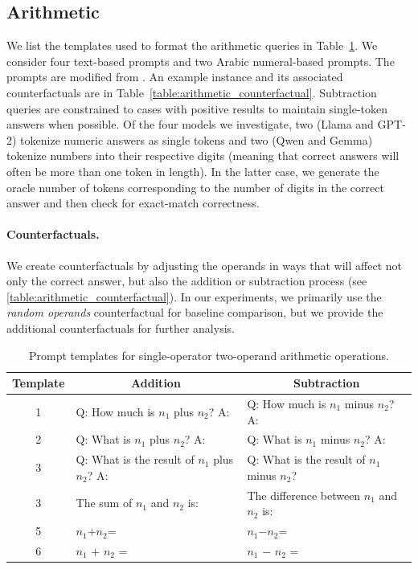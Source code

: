 \documentclass{article}
\theoremstyle{plain}
\theoremstyle{definition}
\theoremstyle{remark}
\begin{document}
\newpage
\subsection{Arithmetic}\label{app:arithmetic_data}
We list the templates used to format the arithmetic queries in Table~\ref{table:arithmetic_query_template}. We consider four text-based prompts and two Arabic numeral-based prompts. The prompts are modified from \citet{stolfo2023mechanistic}. An example instance and its associated counterfactuals are in  Table~\ref{table:arithmetic_counterfactual}. Subtraction queries are constrained to cases with positive results to maintain single-token answers when possible. 
Of the four models we investigate, two (Llama and GPT-2) tokenize numeric answers as single tokens and two (Qwen and Gemma) tokenize numbers into their respective digits (meaning that correct answers will often be more than one token in length). In the latter case, we generate the oracle number of tokens corresponding to the number of digits in the correct answer and then check for exact-match correctness.


\paragraph{Counterfactuals.} We create counterfactuals by adjusting the operands in ways that will affect not only the correct answer, but also the addition or subtraction process (see \autoref{table:arithmetic_counterfactual}). In our experiments, we primarily use the \textit{random operands} counterfactual for baseline comparison, but we provide the additional counterfactuals for further analysis. 


\begin{table}[h]
    \centering
    \small
    \caption{Prompt templates for single-operator two-operand arithmetic operations.}
    \begin{tabular}{c ll}
    \toprule
    \textbf{Template} & \multicolumn{1}{c}{\bf Addition} & \multicolumn{1}{c}{\bf Subtraction}   \\ 
    \midrule
    1& Q: How much is $n_1$ plus $n_2$? A: & Q: How much is $n_1$ minus $n_2$? A: \\
    2 & Q: What is $n_1$ plus $n_2$? A: & Q: What is $n_1$ minus $n_2$? A:  \\
    3 & Q: What is the result of $n_1$ plus $n_2$? A: & Q: What is the result of $n_1$ minus $n_2$? \\ 
    3 & The sum of $n_1$ and $n_2$ is:& The difference between $n_1$ and $n_2$ is:\\ 
    5 & $n_1$$+$$n_2$=& $n_1$$-$$n_2$=\\
    6 & $n_1$ $+$ $n_2$ =& $n_1$ $-$ $n_2$ =\\
    \bottomrule
    \end{tabular}
    \label{table:arithmetic_query_template}
\end{table}
\end{document}
